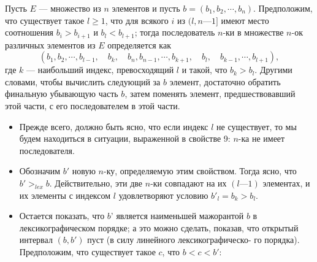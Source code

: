 {\begin{property}

\hspace*{0.55cm}Пусть $E$ — множество из $n$ элементов и пусть $b = (b_1,b_2,\cdots ,b_n)$. 
Предположим, что существует такое $l \geq 1$, что для всякого $i$ из $(l, n — 1]$ 
имеют место соотношения $b_i > b_{i+1}$ и $b_l < b_{l+1}$; тогда последователь 
$n$-ки в множестве $n$-ок различных элементов из $E$ определяется как
$$
(b_1, b_2,\cdots,b_{l-1},\quad b_k,\quad b_n,b_{n-1},\cdots,b_{k+1},\quad b_l,\quad b_{k-1},\cdots,b_{l+1}),
$$
где $k$ — наибольший индекс, превосходящий $l$ и такой, что $b_k > b_l$. 
Другими словами, чтобы вычислить следующий за $b$ элемент,  
достаточно обратить финальную убывающую часть $b$, затем поменять элемент, 
предшествовавший этой части, с его последователем в этой части. 
\end{property}
\begin{myproof}
\begin{itemize}
\item Прежде всего, должно быть ясно, что если индекс $l$ не существует, 
то мы будем находиться в ситуации, выраженной в свойстве 9: $n$-ка 
не имеет последователя. 
\item Обозначим $b'$ новую $n$-ку, определяемую этим свойством. Тогда 
ясно, что $b' >_{lex} b$. Действительно, эти две $n$-ки совпадают на их 
$(l—1)$ элементах, и их элементы с индексом $l$ удовлетворяют условию 
$b'_l = b_k > b_l$. 
\item Остается показать, что $b$' является наименьшей мажорантой $b$ в 
лексикографическом порядке; а это можно сделать, показав, что  
открытый интервал $(b,b')$ пуст (в силу линейного лексикографическо- 
го порядка). Предположим, что существует такое $c$, что $b < c < b'$:
\end{itemize}


\end{myproof}}
